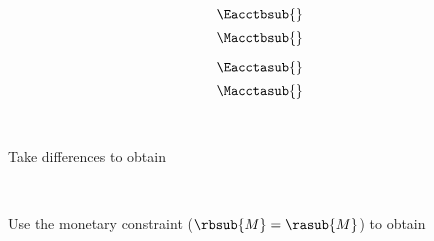 

\begin{landscape}

\linespread{1}


\sectionsep{}

{
  \begin{equation}
  \Eacctbsub{}
  \end{equation}
}
{
  \begin{equation}
  \Macctbsub{}
  \end{equation}
}

\sectionsep{}


{
  \begin{equation}
  \Eacctasub{}
  \end{equation}
}
{
  \begin{equation}
  \Macctasub{}
  \end{equation}
}

\sectionsep{}

\derivsection{}
{
  ~
    
  Take differences to obtain

}
{
  ~
    
  Use the monetary constraint ($\rbsub{M} = \rasub{M}$) to obtain
}
\end{landscape}